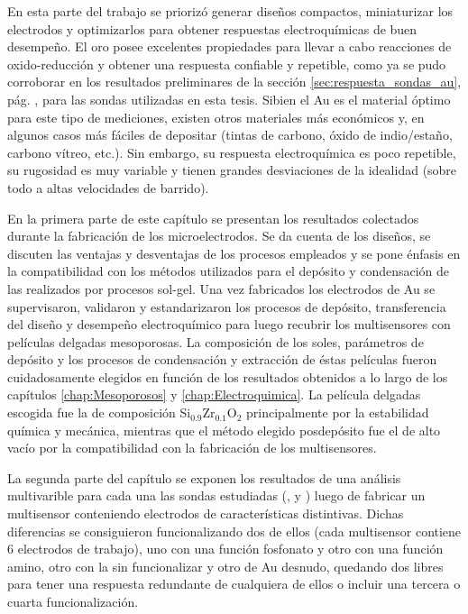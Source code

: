 	En esta parte del trabajo se priorizó generar diseños compactos, miniaturizar los electrodos y optimizarlos para obtener respuestas electroquímicas de buen desempeño. El oro posee excelentes propiedades para llevar a cabo reacciones de oxido-reducción y obtener una respuesta confiable y repetible, como ya se pudo corroborar en los resultados preliminares de la sección \ref{sec:respuesta_sondas_au}, pág. \pageref{sec:respuesta_sondas_au}, para las sondas utilizadas en esta tesis. Si\space bien el Au es el material óptimo para este tipo de mediciones, existen otros materiales más económicos y, en algunos casos más fáciles de depositar (tintas de carbono, óxido de indio/estaño, carbono vítreo, etc.). Sin embargo, su respuesta electroquímica es poco repetible, su rugosidad es muy variable y tienen grandes desviaciones de la idealidad (sobre todo a altas velocidades de barrido).\cite{Wi2000,Villullas2000}

	En la primera parte de este capítulo se presentan los resultados colectados durante la fabricación de los microelectrodos. Se da cuenta de los diseños, se discuten las ventajas y desventajas de los procesos empleados y se pone énfasis en la compatibilidad con los métodos utilizados para el depósito y condensación de las \pdm\space realizados por procesos sol-gel. 
	Una vez fabricados los electrodos de Au se supervisaron, validaron y estandarizaron los procesos de depósito, transferencia del diseño y desempeño electroquímico para luego recubrir los multisensores con películas delgadas mesoporosas. La composición de los soles, parámetros de depósito y los procesos de condensación y extracción de éstas películas fueron cuidadosamente elegidos en función de los resultados obtenidos a lo largo de los capítulos \ref{chap:Mesoporosos} y \ref{chap:Electroquimica}. La película delgadas escogida fue la de composición Si$_{0.9}$Zr$_{0.1}$O$_2$ principalmente por la estabilidad química y mecánica, mientras que el método elegido posdepósito fue el de alto vacío por la compatibilidad con la fabricación de los multisensores.

	La segunda parte del capítulo se exponen los resultados de una análisis multivarible para cada una las sondas estudiadas (\ru, \fe\space y \fc) luego de fabricar un multisensor conteniendo electrodos de características distintivas. Dichas diferencias se consiguieron funcionalizando dos de ellos (cada multisensor contiene 6 electrodos de trabajo), uno con una función fosfonato y otro con una función amino, otro con la \pdm\space sin funcionalizar y otro de Au desnudo, quedando dos libres para tener una respuesta redundante de cualquiera de ellos o incluir una tercera o cuarta funcionalización.  

